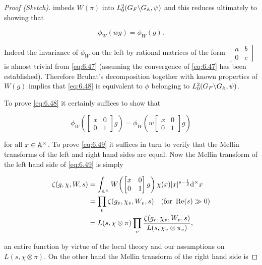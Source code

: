 \begin{proof}[Proof (Sketch)]
imbeds $W(\pi)$ into $L_0^2(G_F \backslash G_{\mathbb{A}}, \psi)$ and this reduces ultimately to showing that

\begin{equation}\label{eq:6.48}
\phi_W(wg) = \phi_W(g).\tag{6.48}
\end{equation}

Indeed the invariance of $\phi_W$ on the left by rational matrices of the form $\begin{bmatrix} a & b \\ 0 & c \end{bmatrix}$ is almost trivial from \eqref{eq:6.47} (assuming the convergence of \eqref{eq:6.47} has been established). Therefore Bruhat's decomposition together with known properties of $W(g)$ implies that \eqref{eq:6.48} is equivalent to $\phi$ belonging to $L_0^2(G_F \backslash G_{\mathbb{A}}, \psi)$.

To prove \eqref{eq:6.48} it certainly suffices to show that

\begin{equation}\label{eq:6.49}
\phi_W\!\left(\begin{bmatrix} x & 0 \\ 0 & 1 \end{bmatrix} g\right) = \phi_W\!\left(w\begin{bmatrix} x & 0 \\ 0 & 1 \end{bmatrix} g\right)\tag{6.49}
\end{equation}

for all $x \in \mathbb{A}^{\times}$. To prove \eqref{eq:6.49} it suffices in turn to verify that the Mellin transforms of the left and right hand sides are equal. Now the Mellin transform of the left hand side of \eqref{eq:6.49} is simply

\[
\begin{aligned}
\zeta(g, \chi, W, s) &= \int_{\mathbb{A}^{\times}} W\!\left(\begin{bmatrix} x & 0 \\ 0 & 1 \end{bmatrix} g\right) \chi(x) |x|^{s - \frac{1}{2}} \mathrm{d}^{\times} x\\
&= \prod_v \zeta(g_v, \chi_v, W_v, s) \quad (\text{for } \operatorname{Re}(s) \gg 0)\\
&= L(s, \chi \otimes \pi) \prod_v \frac{\zeta(g_v, \chi_v, W_v, s)}{L(s, \chi_v \otimes \pi_v)},
\end{aligned}
\]

an entire function by virtue of the local theory and our assumptions on $L(s, \chi \otimes \pi)$. On the other hand the Mellin transform of the right hand side is


\end{proof}
